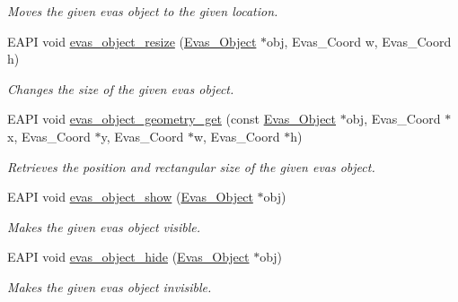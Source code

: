 \begin{DoxyCompactItemize}
\begin{DoxyCompactList}\small\item\em Moves the given evas object to the given location. \item\end{DoxyCompactList}\item 
EAPI void \hyperlink{group__Evas__Object__Group__Basic_ga34df8b33704deafd2a25f40e3c09d149}{evas\_\-object\_\-resize} (\hyperlink{group__Evas__Object__Group_ga9e19e6dd1f517a0ba437c0114d3e7c97}{Evas\_\-Object} $\ast$obj, Evas\_\-Coord w, Evas\_\-Coord h)
\begin{DoxyCompactList}\small\item\em Changes the size of the given evas object. \item\end{DoxyCompactList}\item 
EAPI void \hyperlink{group__Evas__Object__Group__Basic_ga5fa60c701af13dac5dd31071167309d2}{evas\_\-object\_\-geometry\_\-get} (const \hyperlink{group__Evas__Object__Group_ga9e19e6dd1f517a0ba437c0114d3e7c97}{Evas\_\-Object} $\ast$obj, Evas\_\-Coord $\ast$x, Evas\_\-Coord $\ast$y, Evas\_\-Coord $\ast$w, Evas\_\-Coord $\ast$h)
\begin{DoxyCompactList}\small\item\em Retrieves the position and rectangular size of the given evas object. \item\end{DoxyCompactList}\item 
EAPI void \hyperlink{group__Evas__Object__Group__Basic_ga769ad9a3e3daecb7a828196a2c86332f}{evas\_\-object\_\-show} (\hyperlink{group__Evas__Object__Group_ga9e19e6dd1f517a0ba437c0114d3e7c97}{Evas\_\-Object} $\ast$obj)
\begin{DoxyCompactList}\small\item\em Makes the given evas object visible. \item\end{DoxyCompactList}\item 
EAPI void \hyperlink{group__Evas__Object__Group__Basic_ga495807707f06f9acd4de8590a8c92148}{evas\_\-object\_\-hide} (\hyperlink{group__Evas__Object__Group_ga9e19e6dd1f517a0ba437c0114d3e7c97}{Evas\_\-Object} $\ast$obj)
\begin{DoxyCompactList}\small\item\em Makes the given evas object invisible. \item\end{DoxyCompactList}\item 

\end{DoxyCompactItemize}
